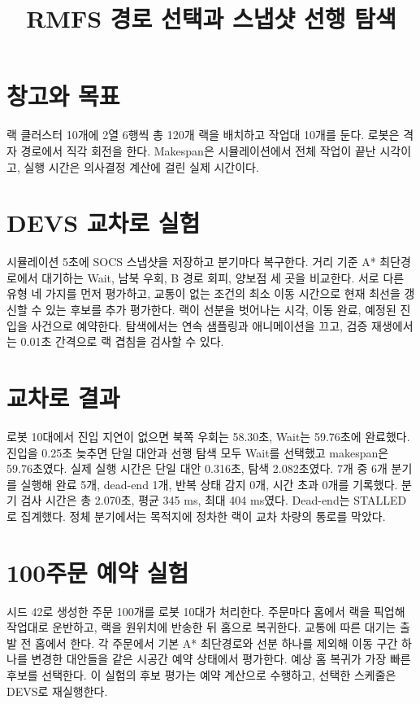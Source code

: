 \documentclass[11pt]{article}
\title{RMFS 경로 선택과 스냅샷 선행 탐색}
\date{}
\begin{document}
\maketitle

\section{창고와 목표}
랙 클러스터 10개에 2열 6행씩 총 120개 랙을 배치하고 작업대 10개를 둔다. 로봇은 격자 경로에서 직각 회전을 한다. Makespan은 시뮬레이션에서 전체 작업이 끝난 시각이고, 실행 시간은 의사결정 계산에 걸린 실제 시간이다.

\section{DEVS 교차로 실험}
시뮬레이션 5초에 SOCS 스냅샷을 저장하고 분기마다 복구한다. 거리 기준 A* 최단경로에서 대기하는 Wait, 남북 우회, B 경로 회피, 양보점 세 곳을 비교한다. 서로 다른 유형 네 가지를 먼저 평가하고, 교통이 없는 조건의 최소 이동 시간으로 현재 최선을 갱신할 수 있는 후보를 추가 평가한다. 랙이 선분을 벗어나는 시각, 이동 완료, 예정된 진입을 사건으로 예약한다. 탐색에서는 연속 샘플링과 애니메이션을 끄고, 검증 재생에서는 0.01초 간격으로 랙 겹침을 검사할 수 있다.

\section{교차로 결과}
로봇 10대에서 진입 지연이 없으면 북쪽 우회는 58.30초, Wait는 59.76초에 완료했다. 진입을 0.25초 늦추면 단일 대안과 선행 탐색 모두 Wait를 선택했고 makespan은 59.76초였다. 실제 실행 시간은 단일 대안 0.316초, 탐색 2.082초였다. 7개 중 6개 분기를 실행해 완료 5개, dead-end 1개, 반복 상태 감지 0개, 시간 초과 0개를 기록했다. 분기 검사 시간은 총 2.070초, 평균 345 ms, 최대 404 ms였다. Dead-end는 STALLED로 집계했다. 정체 분기에서는 목적지에 정차한 랙이 교차 차량의 통로를 막았다.

\section{100주문 예약 실험}
시드 42로 생성한 주문 100개를 로봇 10대가 처리한다. 주문마다 홈에서 랙을 픽업해 작업대로 운반하고, 랙을 원위치에 반송한 뒤 홈으로 복귀한다. 교통에 따른 대기는 출발 전 홈에서 한다. 각 주문에서 기본 A* 최단경로와 선분 하나를 제외해 이동 구간 하나를 변경한 대안들을 같은 시공간 예약 상태에서 평가한다. 예상 홈 복귀가 가장 빠른 후보를 선택한다. 이 실험의 후보 평가는 예약 계산으로 수행하고, 선택한 스케줄은 DEVS로 재실행한다.
\end{document}
